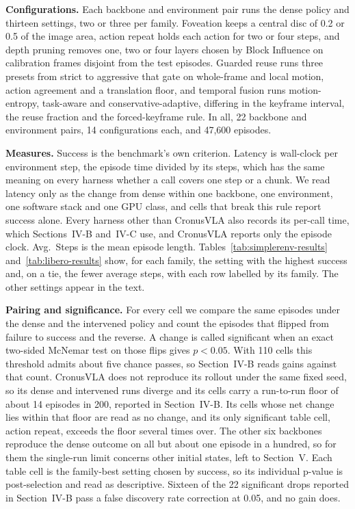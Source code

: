 \documentclass[letterpaper, 10 pt, conference]{ieeeconf}
\begin{document}
\textbf{Configurations.} Each backbone and environment pair runs the dense
policy and thirteen settings, two or three per family. Foveation keeps a
central disc of 0.2 or 0.5 of the image area, action repeat holds each
action for two or four steps, and depth pruning removes one, two or four
layers chosen by Block Influence on calibration frames disjoint from the
test episodes.
Guarded reuse runs three presets from strict to aggressive that gate on
whole-frame and local motion, action agreement and a translation floor, and
temporal fusion
runs motion-entropy, task-aware and conservative-adaptive, differing in the
keyframe interval, the reuse fraction and the forced-keyframe rule. In all,
22 backbone and environment pairs, 14 configurations each, and 47,600
episodes.

\textbf{Measures.} Success is the benchmark's own criterion. Latency is
wall-clock per environment step, the episode time divided by its steps,
which has the same meaning on every harness whether a call covers one step
or a chunk. We read latency only as the change from dense within one backbone, one
environment, one software stack and one GPU class, and cells that break
this rule report success alone.
Every harness other than CronusVLA also records its per-call time, which
Sections~IV-B and~IV-C use, and CronusVLA reports only the episode clock. Avg.\ Steps is the mean episode length. Tables~\ref{tab:simplerenv-results}
and~\ref{tab:libero-results} show, for each family, the setting with the
highest success and, on a tie, the fewer average steps, with each row
labelled by its family. The other settings appear in the text.

\textbf{Pairing and significance.} For every cell we compare the same
episodes under the dense and the intervened policy and count the episodes
that flipped from failure to success and the reverse. A change is called
significant when an exact two-sided McNemar test on those flips gives
$p < 0.05$. With 110 cells this threshold admits about five chance passes,
so Section~IV-B reads gains against that count. CronusVLA does not
reproduce its rollout under the same fixed seed, so its dense and
intervened runs diverge and its cells carry a run-to-run floor of about 14
episodes in 200, reported in Section~IV-B. Its cells whose net change lies
within that floor are read as no change, and its only significant table
cell, action repeat, exceeds the floor several times over. The other six backbones
reproduce the dense outcome on all but about one episode in a hundred, so
for them the single-run limit concerns other initial states, left to
Section~V. Each table cell is the family-best setting chosen by success, so
its individual p-value is post-selection and read as descriptive. Sixteen
of the 22 significant drops reported in Section~IV-B pass a false discovery
rate correction at 0.05, and no gain does.
\end{document}
